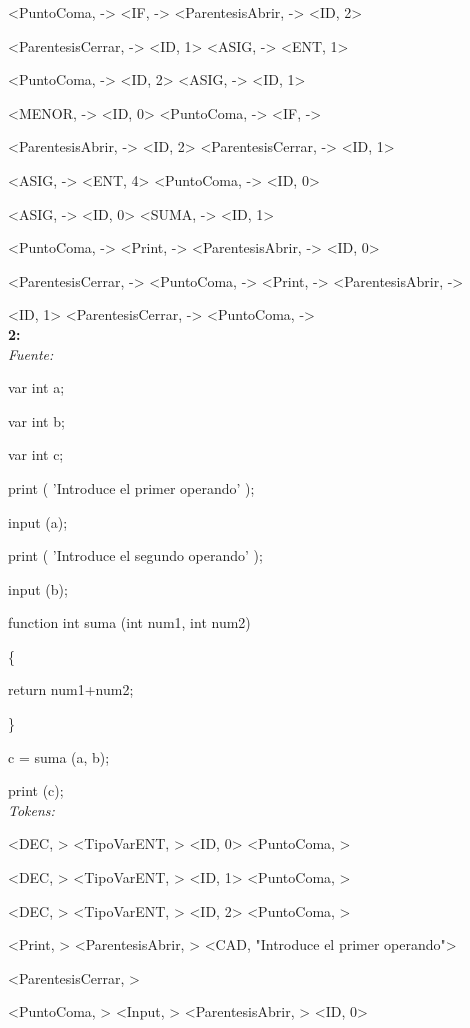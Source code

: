 \documentclass{article}
\begin{document}
 \< \> 
 <PuntoComa, -> 
 <IF, -> 
 <ParentesisAbrir, -> 
 <ID, 2> 
 
 \< \> 
 <ParentesisCerrar, -> 
 <ID, 1> 
 <ASIG, -> 
 <ENT, 1> 
 
 \< \> 
 <PuntoComa, -> 
 <ID, 2> 
 <ASIG, -> 
 <ID, 1> 
 
 \< \> 
 <MENOR, -> 
 <ID, 0> 
 <PuntoComa, -> 
 <IF, -> 
 
 \< \> 
 <ParentesisAbrir, -> 
 <ID, 2> 
 <ParentesisCerrar, -> 
 <ID, 1> 
 
 \< \> 
 <ASIG, -> 
 <ENT, 4> 
 <PuntoComa, -> 
 <ID, 0> 
 
 \< \> 
 <ASIG, -> 
 <ID, 0> 
 <SUMA, -> 
 <ID, 1> 
 
 \< \> 
 <PuntoComa, -> 
 <Print, -> 
 <ParentesisAbrir, -> 
 <ID, 0> 
 
 \< \> 
 <ParentesisCerrar, -> 
 <PuntoComa, -> 
 <Print, -> 
 <ParentesisAbrir, -> 
 
 \< \> 
 <ID, 1> 
 <ParentesisCerrar, -> 
 <PuntoComa, -> \bigskip \\
\textbf{2:}\medskip\\
\emph{Fuente:}

var int a;

var int b;

var int c;

print ( 'Introduce el primer operando' );

input (a);

print ( 'Introduce el segundo operando' );

input (b);
 
 function int suma (int num1, int num2)

\{

	return num1+num2;
	
\}

c = suma (a, b);

print (c);\medskip \\
\emph{Tokens:}

\< \> 
 <DEC, > 
 <TipoVarENT, > 
 <ID, 0> 
 <PuntoComa, > 
 
 \< \> 
 <DEC, > 
 <TipoVarENT, > 
 <ID, 1> 
 <PuntoComa, > 
 
 \< \> 
 <DEC, > 
 <TipoVarENT, > 
 <ID, 2> 
 <PuntoComa, >
 
 \< \> 
 <Print, > 
 <ParentesisAbrir, > 
 <CAD, \textnormal{"Introduce el primer operando"}> 
 
 \< \> 
 <ParentesisCerrar, > 
 
 \< \> 
 <PuntoComa, > 
 <Input, > 
 <ParentesisAbrir, > 
 <ID, 0> 
 
\end{document}
